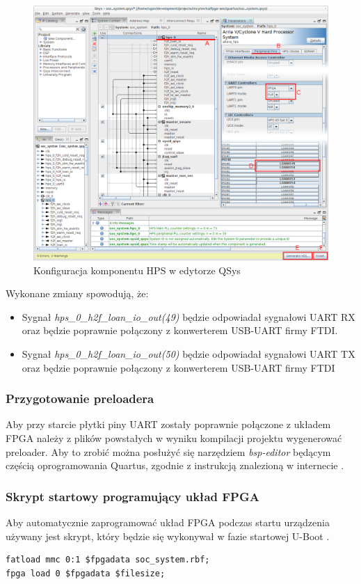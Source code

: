 \begin{figure}[!h]
\includegraphics[width=\textwidth]{pictures/qsys.png}
\caption{Konfiguracja komponentu HPS w edytorze QSys}
\label{fig:qsys-hps}
\end{figure}

Wykonane zmiany spowodują, że:
\begin{itemize}[noitemsep]
\item Sygnał \textit{hps\_0\_h2f\_loan\_io\_out(49)} będzie odpowiadał sygnałowi UART RX oraz będzie poprawnie połączony z konwerterem USB-UART firmy FTDI.
\item Sygnał \textit{hps\_0\_h2f\_loan\_io\_out(50)} będzie odpowiadał sygnałowi UART TX oraz będzie poprawnie połączony z konwerterem USB-UART firmy FTDI
\end{itemize}


\subsubsection{Przygotowanie preloadera}
\label{sec:uart-preloader-gen}
Aby przy starcie płytki piny UART zostały poprawnie połączone z układem FPGA należy z plików powstałych w wyniku kompilacji projektu wygenerować preloader. Aby to zrobić można posłużyć się narzędziem \textit{bsp-editor} będącym częścią oprogramowania Quartus, zgodnie z instrukcją znalezioną w internecie \cite{rocketboards-preloader}.

\subsubsection{Skrypt startowy programujący układ FPGA}
Aby automatycznie zaprogramować układ FPGA podczas startu urządzenia używany jest skrypt, który będzie się wykonywał w fazie startowej U-Boot \cite{rocketboards-uboot-script}.
\begin{lstlisting}
fatload mmc 0:1 $fpgadata soc_system.rbf;
fpga load 0 $fpgadata $filesize;
\end{lstlisting}

